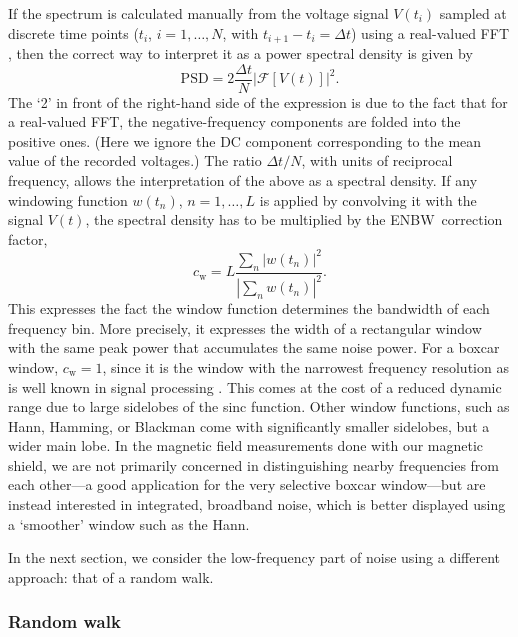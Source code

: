 If the spectrum is calculated manually from the voltage signal $V(t_i)$ sampled
at discrete time points ($t_i$, $i=1,\dots,N$, with $t_{i+1}-t_i=\Delta t$)
using a real-valued \gls{FFT} \cite{cooley1965algorithm}, then the correct way
to interpret it as a power spectral density is given by
%
$$
\text{PSD}=2\frac{\Delta t}{N}\left|\mathcal{F}\left[V(t)\right]\right|^2.
$$
%
The `2' in front of the right-hand side of the expression is due to the fact
that for a real-valued \gls{FFT}, the negative-frequency components are folded
into the positive ones. (Here we ignore the DC component corresponding to the
mean value of the recorded voltages.) The ratio $\Delta t/N$, with units of
reciprocal frequency, allows the interpretation of the above as a spectral
density. If any windowing function $w(t_n)$, $n=1,\dots,L$ is applied by
convolving it with the signal $V(t)$, the spectral density has to be multiplied
by the \gls{ENBW}\ correction factor,
%
$$
c_\text{w}=L\frac{\sum_n|w(t_n)|^2}{|\sum_n w(t_n)|^2}.
$$
%
This expresses the fact the window function determines the bandwidth of each
frequency bin. More precisely, it expresses the width of a rectangular window
with the same peak power that accumulates the same noise power.
\cite{harris1978use} For a boxcar window, $c_\text{w}=1$, since it is the window
with the narrowest frequency resolution as is well known in signal processing
\cite[sect~5.2.4]{broughton2018discrete}. This comes at the cost of a reduced
dynamic range due to large sidelobes of the sinc function. Other window
functions, such as Hann, Hamming, or Blackman come with significantly smaller
sidelobes, but a wider main lobe. \cite{proakis2006digital,
oppenheim2010discrete} In the magnetic field measurements done with our magnetic
shield, we are not primarily concerned in distinguishing nearby frequencies from
each other---a good application for the very selective boxcar window---but are
instead interested in integrated, broadband noise, which is better displayed
using a `smoother' window such as the Hann.

In the next section, we consider the low-frequency part of noise using a
different approach: that of a random walk.

\subsubsection{Random walk}

